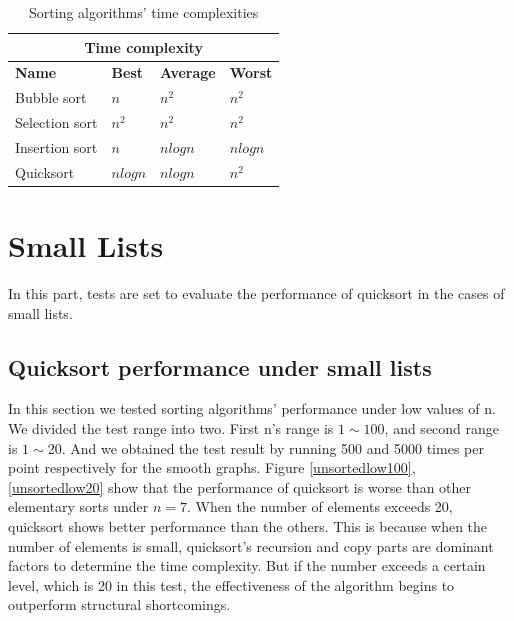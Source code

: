 \documentclass[12pt]{article}
\begin{document}
\begin{table}[htb!]
  \centering
  \begin{tabular}{ |p{3cm}||p{2cm}|p{2cm}|p{2cm}|  }
    \hline
    \multicolumn{4}{|c|}{\textbf{Time complexity}} \\
    \hline
    \textbf{Name} & \textbf{Best} & \textbf{Average} & \textbf{Worst} \\
    \hline 
    Bubble sort    & $n$     & $n^{2}$ & $n^{2}$ \\[0.5ex]
    Selection sort & $n^{2}$ & $n^{2}$ & $n^{2}$ \\[0.5ex]
    Insertion sort & $n$     & $nlogn$ & $nlogn$ \\[0.5ex]
    Quicksort      & $nlogn$ & $nlogn$ & $n^{2}$ \\[0.5ex]
    \hline
  \end{tabular}
  \caption{Sorting algorithms' time complexities}
  \label{time complexity}
\end{table}

\medskip

\section{Small Lists}
In this part, tests are set to evaluate the performance of quicksort in the cases of small lists.
\subsection{Quicksort performance under small lists}
In this section we tested sorting algorithms' performance under low values of n. 
We divided the test range into two. First n's range is $1 \sim 100$, and second range is $1 \sim 20$.
And we obtained the test result by running 500 and 5000 times per point respectively for
 the smooth graphs. Figure \ref{unsortedlow100}, \ref{unsortedlow20} show that the
performance of quicksort is worse than other elementary sorts under $n=7$. When the 
number of elements exceeds 20, quicksort shows better performance 
than the others. This is because when the number of elements is small, quicksort's 
recursion and copy parts are dominant factors to determine the time complexity.
But if the number exceeds a certain level, which is 20 in this test, 
the effectiveness of the algorithm begins to outperform structural shortcomings. 
 
\end{document}
